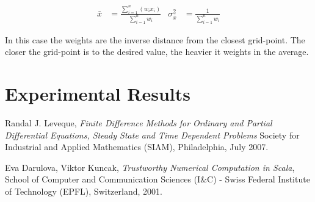 \begin{align*}
    \bar{x} & = \frac{\sum_{i=1}^n(w_ix_i)}{\sum_{i=1}^n w_i}&
    \sigma^2_{\bar{x}}& = \frac{1}{\sum_{i=1}^n w_i}
\end{align*}

In this case the weights are the inverse distance from the closest
grid-point. The closer the grid-point is to the desired value, the
heavier it weights in the average.
\section{Experimental Results}


\begin{thebibliography}{9}

    Randal J. Leveque,
    \emph{Finite Difference Methods for Ordinary and Partial Differential Equations,
        Steady State and Time Dependent Problems}
    Society for Industrial and Applied Mathematics (SIAM),
    Philadelphia,
    July 2007.

    Eva Darulova, Viktor Kuncak,
    \emph{Trustworthy Numerical Computation in Scala},
    School of Computer and Communication Sciences (I\&C) -
    Swiss Federal Institute of Technology (EPFL), Switzerland,
    2001.

\end{thebibliography}

